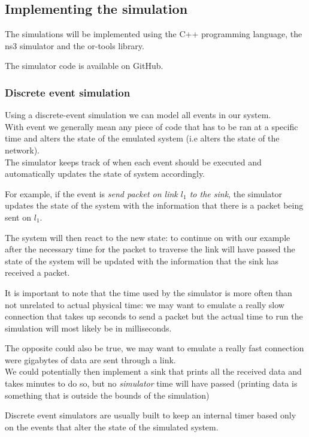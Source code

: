 \subsection{Implementing the simulation}

The simulations will be implemented using the C++ programming language, the ns3 simulator and the or-tools library.

The simulator code is available on GitHub. \cite{thesis_source_code}

\subsubsection{Discrete event simulation}

Using a discrete-event simulation we can model all events in our system. \\
With event we generally mean any piece of code that has to be ran at a specific time and alters the state of the emulated system (i.e alters the state of the network). \\
The simulator keeps track of when each event should be executed and automatically updates the state of system accordingly.

For example, if the event is \textit{send packet on link $l_1$ to the sink}, the simulator updates the state of the system with the information that there is a packet being sent on $l_1$.

The system will then react to the new state: to continue on with our example after the necessary time for the packet to traverse the link will have passed the state of the system will be updated with the information that the sink has received a packet.

It is important to note that the time used by the simulator is more often than not unrelated to actual physical time: we may want to emulate a really slow connection that takes up seconds to send a packet but the actual time to run the simulation will most likely be in milliseconds.

The opposite could also be true, we may want to emulate a really fast connection were gigabytes of data are sent through a link. \\

We could potentially then implement a sink that prints all the received data and takes minutes to do so, but no \textit{simulator} time will have passed (printing data is something that is outside the bounds of the simulation)

Discrete event simulators are usually built to keep an internal timer based only on the events that alter the state of the simulated system.


